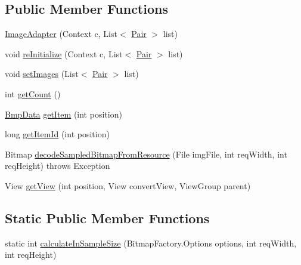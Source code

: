 \subsection*{Public Member Functions}
\begin{DoxyCompactItemize}
\item 
\hyperlink{classcourse_1_1examples_1_1spacesaver_1_1_image_adapter_a4a64ff6f4afb032a7b909d452da4d0f7}{Image\+Adapter} (Context c, List$<$ \hyperlink{classcourse_1_1examples_1_1spacesaver_1_1_pair}{Pair} $>$ list)
\item 
void \hyperlink{classcourse_1_1examples_1_1spacesaver_1_1_image_adapter_a8b457cf9300ede478217eb387fe5e757}{re\+Initialize} (Context c, List$<$ \hyperlink{classcourse_1_1examples_1_1spacesaver_1_1_pair}{Pair} $>$ list)
\item 
void \hyperlink{classcourse_1_1examples_1_1spacesaver_1_1_image_adapter_a1bc7a805204d8065aaddc2ad1b0c4a1e}{set\+Images} (List$<$ \hyperlink{classcourse_1_1examples_1_1spacesaver_1_1_pair}{Pair} $>$ list)
\item 
int \hyperlink{classcourse_1_1examples_1_1spacesaver_1_1_image_adapter_a7446ece5dd5f5c4f4afeb7a19cdb8728}{get\+Count} ()
\item 
\hyperlink{classcourse_1_1examples_1_1spacesaver_1_1_bmp_data}{Bmp\+Data} \hyperlink{classcourse_1_1examples_1_1spacesaver_1_1_image_adapter_a28aa9706d5497b18f2ac7c57d8212391}{get\+Item} (int position)
\item 
long \hyperlink{classcourse_1_1examples_1_1spacesaver_1_1_image_adapter_a54e7407f7a3d8e2e18513e8826ee861e}{get\+Item\+Id} (int position)
\item 
Bitmap \hyperlink{classcourse_1_1examples_1_1spacesaver_1_1_image_adapter_a1cede336baa9c4e6fc4f77c7b92f8537}{decode\+Sampled\+Bitmap\+From\+Resource} (File img\+File, int req\+Width, int req\+Height)  throws Exception 
\item 
View \hyperlink{classcourse_1_1examples_1_1spacesaver_1_1_image_adapter_a4072f1ec52b57c428c4c85261be15986}{get\+View} (int position, View convert\+View, View\+Group parent)
\end{DoxyCompactItemize}
\subsection*{Static Public Member Functions}
\begin{DoxyCompactItemize}
\item 
static int \hyperlink{classcourse_1_1examples_1_1spacesaver_1_1_image_adapter_a76420c1f261150aa098281e6621bd6cf}{calculate\+In\+Sample\+Size} (Bitmap\+Factory.\+Options options, int req\+Width, int req\+Height)
\end{DoxyCompactItemize}
